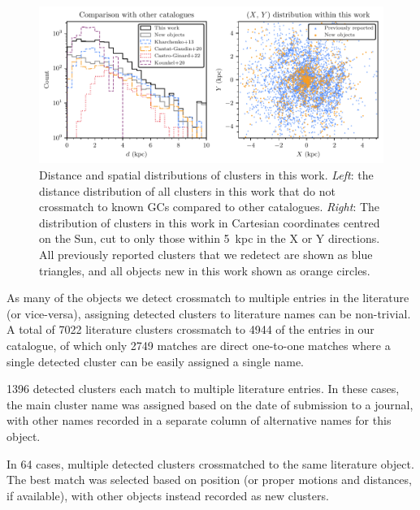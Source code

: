 \begin{figure}[t]
   \centering
   \includegraphics[width=\textwidth]{fig/c3/fig_methods_d_distribution.pdf}
   \caption[Distance and spatial distributions of clusters in this work]{Distance and spatial distributions of clusters in this work. \emph{Left}: the distance distribution of all clusters in this work that do not crossmatch to known GCs compared to other catalogues. \emph{Right}: The distribution of clusters in this work in Cartesian coordinates centred on the Sun, cut to only those within 5~kpc in the X or Y directions. All previously reported clusters that we redetect are shown as blue triangles, and all objects new in this work shown as orange circles.}%
   \label{c3:fig:distance_distribution}
\end{figure}

As many of the objects we detect crossmatch to multiple entries in the literature (or vice-versa), assigning detected clusters to literature names can be non-trivial. A total of 7022 literature clusters crossmatch to 4944 of the entries in our catalogue, of which only 2749 matches are direct one-to-one matches where a single detected cluster can be easily assigned a single name.

1396 detected clusters each match to multiple literature entries. In these cases, the main cluster name was assigned based on the date of submission to a journal, with other names recorded in a separate column of alternative names for this object.

In 64 cases, multiple detected clusters crossmatched to the same literature object. The best match was selected based on position (or proper motions and distances, if available), with other objects instead recorded as new clusters.

